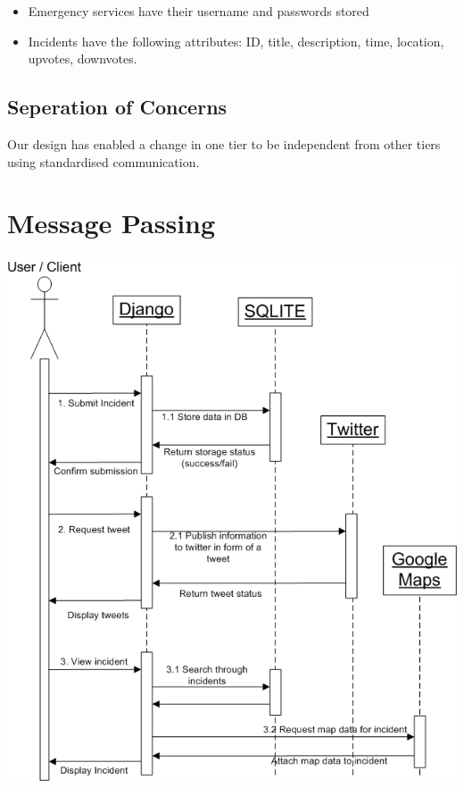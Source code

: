 \documentclass{sig-alt-release2}
\begin{document}
\begin{itemize}
\item    Emergency services have their username and passwords stored
\item Incidents have the following attributes: ID, title, description, time, location, upvotes, downvotes.
\end{itemize}

\subsection{Seperation of Concerns}

Our design has enabled a change in one tier to be independent from other tiers using standardised communication.

\newpage
\section{Message Passing}

\includegraphics[scale=0.4]{img/3.png}
\end{document}
